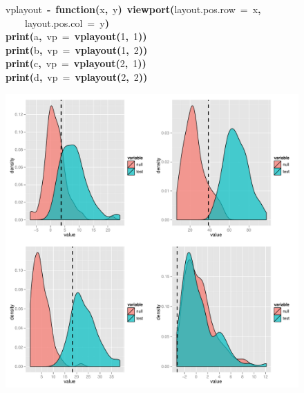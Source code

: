 \documentclass{elsarticle}
\makeatletter
\newcommand{\hlnumber}[1]{\textcolor[rgb]{0,0,0}{#1}}%
\newcommand{\hlfunctioncall}[1]{\textcolor[rgb]{.5,0,.33}{\textbf{#1}}}%
\newcommand{\hlkeyword}[1]{\textbf{#1}}%
\newcommand{\hlargument}[1]{\textcolor[rgb]{.69,.25,.02}{#1}}%
\newcommand{\hlformalargs}[1]{\hlargument{#1}}%
\newcommand{\hlassignement}[1]{\textbf{#1}}%
\newcommand{\hlsymbol}[1]{#1}%
\newcommand{\hlstd}[1]{\textcolor[rgb]{0,0,0}{#1}}%
\newenvironment{kframe}{%
 \def\FrameCommand##1{\hskip\@totalleftmargin \hskip-\fboxsep
 \colorbox{shadecolor}{##1}\hskip-\fboxsep
     \hskip-\linewidth \hskip-\@totalleftmargin \hskip\columnwidth}%
 \MakeFramed {\advance\hsize-\width
   \@totalleftmargin\z@ \linewidth\hsize
   \@setminipage}}%
 {\par\unskip\endMakeFramed}
\newenvironment{knitrout}{}{} %
\makeatother
\begin{document}
\begin{figure}
\begin{center}
\begin{knitrout}
{\begin{kframe}
\begin{flushleft}
\hlstd{}\hlsymbol{vplayout}{\ }\hlassignement{\usebox{\hlnormalsizeboxlessthan}-}{\ }\hlkeyword{function}\hlkeyword{(}\hlformalargs{x}\hlkeyword{,}{\ }\hlformalargs{y}\hlkeyword{)}{\ }\hlfunctioncall{viewport}\hlkeyword{(}\hlargument{layout.pos.row}{\ }\hlargument{=}{\ }\hlsymbol{x}\hlkeyword{,}\hspace*{\fill}\\
\hlstd{}{\ }{\ }{\ }{\ }\hlargument{layout.pos.col}{\ }\hlargument{=}{\ }\hlsymbol{y}\hlkeyword{)}\hspace*{\fill}\\
\hlstd{}\hlfunctioncall{print}\hlkeyword{(}\hlsymbol{a}\hlkeyword{,}{\ }\hlargument{vp}{\ }\hlargument{=}{\ }\hlfunctioncall{vplayout}\hlkeyword{(}\hlnumber{1}\hlkeyword{,}{\ }\hlnumber{1}\hlkeyword{)}\hlkeyword{)}\hspace*{\fill}\\
\hlstd{}\hlfunctioncall{print}\hlkeyword{(}\hlsymbol{b}\hlkeyword{,}{\ }\hlargument{vp}{\ }\hlargument{=}{\ }\hlfunctioncall{vplayout}\hlkeyword{(}\hlnumber{1}\hlkeyword{,}{\ }\hlnumber{2}\hlkeyword{)}\hlkeyword{)}\hspace*{\fill}\\
\hlstd{}\hlfunctioncall{print}\hlkeyword{(}\hlsymbol{c}\hlkeyword{,}{\ }\hlargument{vp}{\ }\hlargument{=}{\ }\hlfunctioncall{vplayout}\hlkeyword{(}\hlnumber{2}\hlkeyword{,}{\ }\hlnumber{1}\hlkeyword{)}\hlkeyword{)}\hspace*{\fill}\\
\hlstd{}\hlfunctioncall{print}\hlkeyword{(}\hlsymbol{d}\hlkeyword{,}{\ }\hlargument{vp}{\ }\hlargument{=}{\ }\hlfunctioncall{vplayout}\hlkeyword{(}\hlnumber{2}\hlkeyword{,}{\ }\hlnumber{2}\hlkeyword{)}\hlkeyword{)}\mbox{}
\normalfont
\end{flushleft}


\centering{}\includegraphics{plot_anoles} 


\end{kframe}}
\end{knitrout}
\end{center}
\end{figure}
\end{document}
